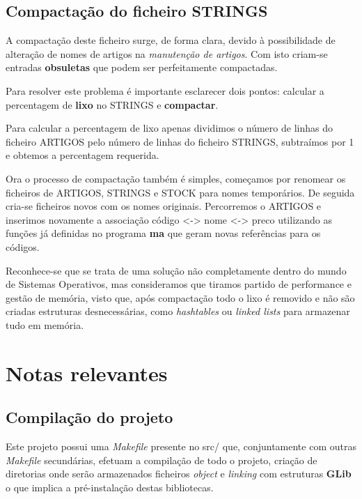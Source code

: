 \documentclass[a4paper,11pt]{report}
\begin{document}
\section{Compactação do ficheiro STRINGS}

\hspace{0.50cm} A compactação deste ficheiro surge, de forma clara, devido à possibilidade de alteração de nomes de artigos na \textit{manutenção de artigos}. Com isto criam-se entradas \textbf{obsuletas} que podem ser perfeitamente compactadas. 

Para resolver este problema é importante esclarecer dois pontos: calcular a percentagem de \textbf{lixo} no STRINGS e \textbf{compactar}.

Para calcular a percentagem de lixo apenas dividimos o número de linhas do ficheiro ARTIGOS pelo número de linhas do ficheiro STRINGS, subtraímos por 1 e obtemos a percentagem requerida.

Ora o processo de compactação também é simples, começamos por renomear os ficheiros de ARTIGOS, STRINGS e STOCK para nomes temporários. De seguida cria-se ficheiros novos com os nomes originais. Percorremos o ARTIGOS e inserimos novamente a associação código <-> nome <-> preco utilizando as funções já definidas no programa \textbf{ma} que geram novas referências para os códigos.

Reconhece-se que se trata de uma solução não completamente dentro do mundo de Sistemas Operativos, mas consideramos que tiramos partido de performance e gestão de memória, visto que, após compactação todo o lixo é removido e não são criadas estruturas desnecessárias, como \textit{hashtables} ou \textit{linked lists} para armazenar tudo em memória.

\chapter{Notas relevantes}

\section{Compilação do projeto}

\hspace{0.50cm} Este projeto possui uma \textit{Makefile} presente no src/ que, conjuntamente com outras \textit{Makefile} secundárias, efetuam a compilação de todo o projeto, criação de diretorias onde serão armazenados ficheiros \textit{object} e \textit{linking} com estruturas \textbf{GLib} o que implica a pré-instalação destas bibliotecas.
\end{document}

